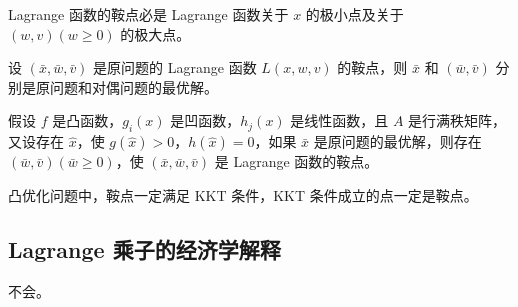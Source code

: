 \begin{theorem}
    Lagrange 函数的鞍点必是 Lagrange 函数关于 $x$ 的极小点及关于 $(w, v)(w \ge 0)$ 的极大点。
\end{theorem}

\begin{theorem}[鞍点定理]
    设 $(\bar{x}, \bar{w}, \bar{v})$ 是原问题的 Lagrange 函数 $L(x, w, v)$ 的鞍点，则 $\bar{x}$ 和 $(\bar{w}, \bar{v})$ 分别是原问题和对偶问题的最优解。
\end{theorem}

\begin{theorem}[鞍点定理]
    假设 $f$ 是凸函数，$g_i(x)$ 是凹函数，$h_j(x)$ 是线性函数，且 $A$ 是行满秩矩阵，又设存在 $\hat{x}$，使 $g(\hat{x}) > 0$，$h(\hat{x}) = 0$，如果 $\bar{x}$ 是原问题的最优解，则存在 $(\bar{w}, \bar{v})(\bar{w} \ge 0)$，使 $(\bar{x}, \bar{w}, \bar{v})$ 是 Lagrange 函数的鞍点。
\end{theorem}

\begin{theorem}
    凸优化问题中，鞍点一定满足 KKT 条件，KKT 条件成立的点一定是鞍点。
\end{theorem}

\subsection{Lagrange 乘子的经济学解释}
不会。

